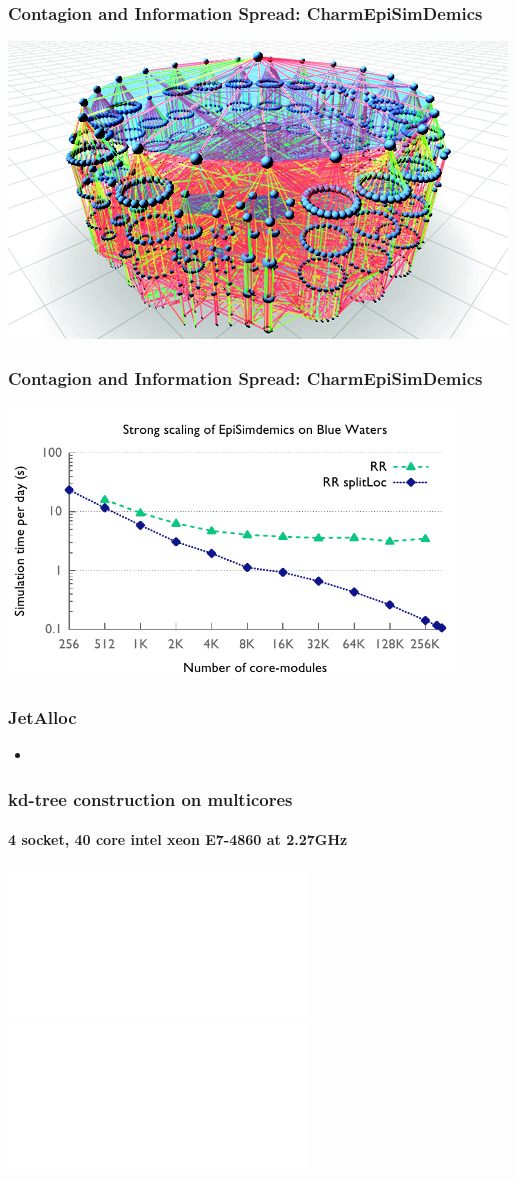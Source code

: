 \begin{frame}
\frametitle{Contagion and Information Spread: CharmEpiSimDemics}
\includegraphics[width=\textwidth]{../figures/contagion.png}
\end{frame}


\begin{frame}
\frametitle{Contagion and Information Spread: CharmEpiSimDemics}
\begin{center}
\includegraphics[width=0.9\textwidth]{../figures/simdemics_strong_scaling.pdf}
\end{center}
\end{frame}


\begin{frame}
\frametitle{JetAlloc}
%
\begin{itemize}
\item
\end{itemize}
%
\end{frame}

\begin{frame}
\frametitle{kd-tree construction on multicores}
\framesubtitle{4 socket, 40 core intel xeon E7-4860 at 2.27GHz}
\includegraphics<1>[height=\textheight]{../figures/kdtree/speedup_8.pdf}
\includegraphics<2>[height=\textheight]{../figures/kdtree/speedup_15.pdf}
\end{frame}


